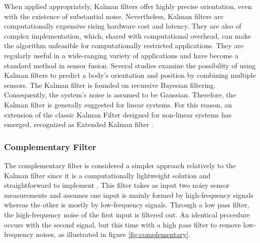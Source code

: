 When applied appropriately, Kalman filters offer highly precise orientation, even with the existence of substantial noise. Nevertheless, Kalman filters are computationally expensive rising hardware cost and latency. They are also of complex implementation, which, shared with computational overhead, can make the algorithm unfeasible for computationally restricted applications. They are regularly useful in a wide-ranging variety of applications and have become a standard method in sensor fusion. Several studies examine the possibility of using Kalman filters to predict a body's orientation and position by combining multiple sensors. The Kalman filter is founded on recursive Bayesian filtering.
Consequently, the system's noise is assumed to be Gaussian. Therefore, the Kalman filter is generally suggested for linear systems. For this reason, an extension of the classic Kalman Filter designed for non-linear systems has emerged, recognized as Extended Kalman filter \cite{wilson2019formulation}.



\subsubsection{Complementary Filter}

The complementary filter is considered a simpler approach relatively to the Kalman filter since it is a computationally lightweight solution and straightforward to implement \cite{higgins1975comparison}. This filter takes as input two noisy sensor measurements and assumes one input is mainly formed by high-frequency signals whereas the other is mostly by low-frequency signals. Through a low pass filter, the high-frequency noise of the first input is filtered out. An identical procedure occurs with the second signal, but this time with a high pass filter to remove low-frequency noises, as illustrated in figure \ref{fig:complementary}.

